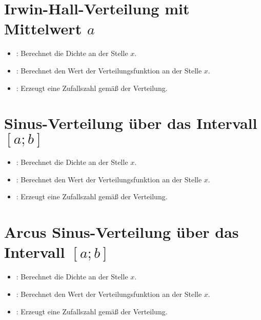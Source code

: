 \section{Irwin-Hall-Verteilung mit Mittelwert \texorpdfstring{$a$}{n}}

\begin{itemize}

\item
{}:
Berechnet die Dichte an der Stelle $x$.

\item
{}:
Berechnet den Wert der Verteilungsfunktion an der Stelle $x$.

\item
{}:
Erzeugt eine Zufallszahl gemäß der Verteilung.

\end{itemize}



\section{Sinus-Verteilung über das Intervall \texorpdfstring{$[a;b]$}{[a;b]}}

\begin{itemize}

\item
{}:
Berechnet die Dichte an der Stelle $x$.

\item
{}:
Berechnet den Wert der Verteilungsfunktion an der Stelle $x$.

\item
{}:
Erzeugt eine Zufallszahl gemäß der Verteilung.

\end{itemize}



\section{Arcus Sinus-Verteilung über das Intervall \texorpdfstring{$[a;b]$}{[a;b]}}

\begin{itemize}

\item
{}:
Berechnet die Dichte an der Stelle $x$.

\item
{}:
Berechnet den Wert der Verteilungsfunktion an der Stelle $x$.

\item
{}:
Erzeugt eine Zufallszahl gemäß der Verteilung.

\end{itemize}



